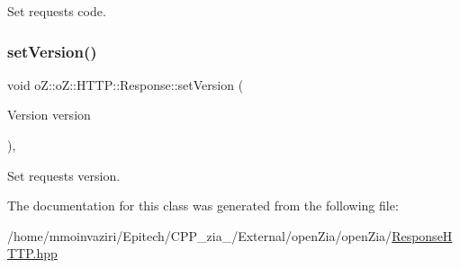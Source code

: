 Set request\textquotesingle{}s code. 

\mbox{\label{classo_z_1_1o_z_1_1_h_t_t_p_1_1_response_a99f05ea27e06aea1ae45f970740d51b8}} 
\subsubsection{\texorpdfstring{setVersion()}{setVersion()}}
{\footnotesize\ttfamily void o\+Z\+::o\+Z\+::\+H\+T\+T\+P\+::\+Response\+::set\+Version (\begin{DoxyParamCaption}\item[{Version}]{version }\end{DoxyParamCaption})\hspace{0.3cm}{\ttfamily [inline]}, {\ttfamily [noexcept]}}



Set request\textquotesingle{}s version. 



The documentation for this class was generated from the following file\+:\begin{DoxyCompactItemize}
\item 
/home/mmoinvaziri/\+Epitech/\+C\+P\+P\+\_\+zia\+\_/\+External/open\+Zia/open\+Zia/\mbox{\hyperlink{_response_h_t_t_p_8hpp}{Response\+H\+T\+T\+P.\+hpp}}\end{DoxyCompactItemize}
